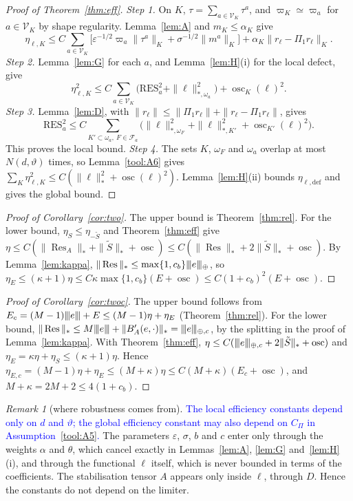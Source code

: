 \documentclass[11pt]{article}
\newcommand{\rev}[1]{\textcolor{blue}{#1}}
\newcommand{\tnorm}[1]{\lvert\kern-0.25ex\lvert\kern-0.25ex\lvert #1\rvert\kern-0.25ex\rvert\kern-0.25ex\rvert}
\newcommand{\eps}{\varepsilon}
\newcommand{\Res}{\operatorname{Res}}
\newcommand{\osc}{\operatorname{osc}}
\newcommand{\Stil}{\tilde S}
\newcommand{\defe}{\mathrm{def}}
\theoremstyle{plain}
\theoremstyle{remark}
\newtheorem{remark}[theorem]{Remark}
\numberwithin{equation}{section}
\begin{document}
\begin{proof}[Proof of Theorem~\ref{thm:eff}]
\emph{Step 1.} On $K$, $\tau=\sum_{a\in\mathcal V_K}\tau^a$, and $\varpi_K\simeq\varpi_a$ for
$a\in\mathcal V_K$ by shape regularity. Lemma~\ref{lem:A} and $m_K\le\alpha_K$ give
\[
  \eta_{\ell,K}\le C\sum_{a\in\mathcal V_K}\bigl[\eps^{-1/2}\varpi_a\|\tau^a\|_K
  +\sigma^{-1/2}\|m^a\|_K\bigr]+\alpha_K\|r_\ell-\Pi_1r_\ell\|_K.
\]
\emph{Step 2.} Lemma~\ref{lem:G} for each $a$, and Lemma~\ref{lem:H}(i) for the local defect, give
\[
  \eta_{\ell,K}^2\le C\sum_{a\in\mathcal V_K}\bigl(\mathrm{RES}_a^2+\|\ell\|_{*,\omega_a}^2\bigr)+\osc_K(\ell)^2.
\]
\emph{Step 3.} Lemma~\ref{lem:D}, with $\|r_\ell\|\le\|\Pi_1r_\ell\|+\|r_\ell-\Pi_1r_\ell\|$, gives
\[
  \mathrm{RES}_a^2\le C\sum_{K'\subset\omega_a,\ F\in\mathcal F_a}
  \bigl(\|\ell\|_{*,\omega_F}^2+\|\ell\|_{*,K'}^2+\osc_{K'}(\ell)^2\bigr).
\]
This proves the local bound. \emph{Step 4.} The sets $K$, $\omega_F$ and $\omega_a$ overlap at most
$N(d,\vartheta)$ times, so Lemma~\ref{tool:A6} gives
$\sum_K\eta_{\ell,K}^2\le C(\|\ell\|_*^2+\osc(\ell)^2)$. Lemma~\ref{lem:H}(ii) bounds
$\eta_{\ell,\defe}$ and gives the global bound.
\end{proof}

\begin{proof}[Proof of Corollary~\ref{cor:two}]
The upper bound is Theorem~\ref{thm:rel}. For the lower bound, $\eta_S\le\eta_{-\Stil}$ and
Theorem~\ref{thm:eff} give
$\eta\le C(\|\Res_A\|_*+\|\Stil\|_*+\osc)\le C(\|\Res\|_*+2\|\Stil\|_*+\osc)$. By
Lemma~\ref{lem:kappa}, $\|\Res\|_*\le\max\{1,c_b\}\tnorm{e}_\oplus$, so
$\eta_E\le(\kappa+1)\eta\le C\kappa\max\{1,c_b\}(E+\osc)\le C(1+c_b)^2(E+\osc)$.
\end{proof}

\begin{proof}[Proof of Corollary~\ref{cor:twoc}]
The upper bound follows from $E_c=(M-1)\tnorm{e}+E\le(M-1)\eta+\eta_E$ (Theorem~\ref{thm:rel}). For the
lower bound, $\|\Res\|_*\le M\tnorm{e}+\|B_A'(e,\cdot)\|_*=\tnorm{e}_{\oplus,c}$, by the splitting in
the proof of Lemma~\ref{lem:kappa}. With Theorem~\ref{thm:eff},
$\eta\le C(\tnorm{e}_{\oplus,c}+2\|\Stil\|_*+\osc)$ and
$\eta_E=\kappa\eta+\eta_S\le(\kappa+1)\eta$. Hence
$\eta_{E,c}=(M-1)\eta+\eta_E\le(M+\kappa)\eta\le C(M+\kappa)(E_c+\osc)$, and
$M+\kappa=2M+2\le4(1+c_b)$.
\end{proof}

\begin{remark}[where robustness comes from]\label{rem:robust}
\rev{The local efficiency constants depend only on $d$ and $\vartheta$; the global efficiency
constant may also depend on $C_\Pi$ in Assumption~\ref{tool:A5}.} The parameters $\eps$, $\sigma$,
$b$ and $c$ enter only through the weights $\alpha$ and $\theta$, which cancel exactly in Lemmas~\ref{lem:A},
\ref{lem:G} and~\ref{lem:H}(i), and through the functional $\ell$ itself, which is never bounded in
terms of the coefficients. The stabilisation tensor $A$ appears only inside $\ell$, through $D$.
Hence the constants do not depend on the limiter.
\end{remark}
\end{document}

